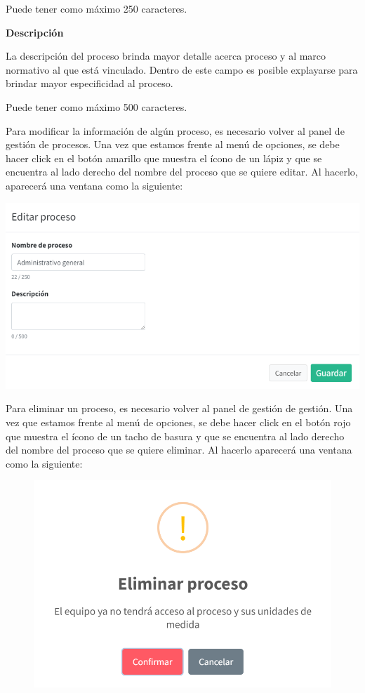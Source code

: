 \documentclass[
  letterpaper,
  DIV=11,
  numbers=noendperiod]{scrreprt}
\begin{document}
Puede tener como máximo 250 caracteres.

\textbf{Descripción}

La descripción del proceso brinda mayor detalle acerca proceso y al
marco normativo al que está vinculado. Dentro de este campo es posible
explayarse para brindar mayor especificidad al proceso.

Puede tener como máximo 500 caracteres.

Para modificar la información de algún proceso, es necesario volver al
panel de gestión de procesos. Una vez que estamos frente al menú de
opciones, se debe hacer click en el botón amarillo que muestra el ícono
de un lápiz y que se encuentra al lado derecho del nombre del proceso
que se quiere editar. Al hacerlo, aparecerá una ventana como la
siguiente:

\includegraphics{./Editar proceso.png}

Para eliminar un proceso, es necesario volver al panel de gestión de
gestión. Una vez que estamos frente al menú de opciones, se debe hacer
click en el botón rojo que muestra el ícono de un tacho de basura y que
se encuentra al lado derecho del nombre del proceso que se quiere
eliminar. Al hacerlo aparecerá una ventana como la siguiente:

\begin{figure}

{\centering \includegraphics{./Eliminar proceso.png}

}

\end{figure}
\end{document}
